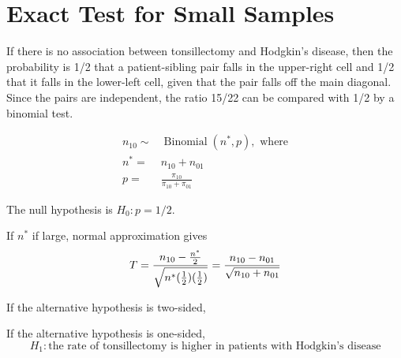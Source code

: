 \section{Exact Test for Small Samples}If there is no association between tonsillectomy and Hodgkin's
disease, then the probability is 1/2 that a patient-sibling pair falls in
the upper-right cell and 1/2 that it falls in the lower-left cell, given
that the pair falls off the main diagonal. Since the pairs are
independent, the ratio 15/22 can be compared with 1/2 by a
binomial test.

\begin{align*}
	n_{10} \sim& \operatorname{Binomial}(n^*, p), \text{ where}\\
	n^* =& n_{10} + n_{01}\\
	p =& \frac{\pi_{10}}{\pi_{10} + \pi_{01}}
\end{align*}

The null hypothesis is $H_0: p = 1/2$.

If $n^*$ if large, normal approximation gives
\[T = \frac{n_{10} - \frac{n^*}{2}}{\sqrt{n^* (\frac{1}{2}) (\frac{1}{2})}} = \frac{n_{10} - n_{01}}{\sqrt{n_{10} + n_{01}}}\]

If the alternative hypothesis is two-sided,


If the alternative hypothesis is one-sided,
\[H_1: \text{the rate of tonsillectomy is higher in patients with Hodgkin's
disease}\]
